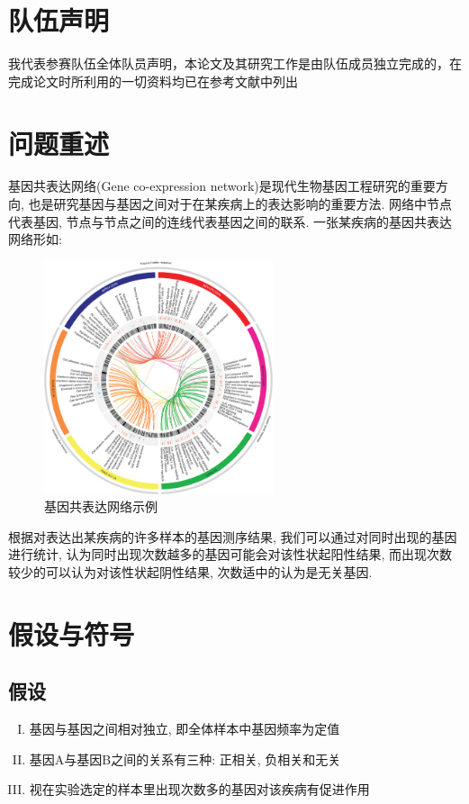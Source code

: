 \documentclass[zihao=-4]{ctexart}
\begin{document}
\newpage

\section*{队伍声明}

我代表参赛队伍全体队员声明，本论文及其研究工作是由队伍成员独立完成的，在完成论文时所利用的一切资料均已在参考文献中列出 
\newpage
\tableofcontents

\section{问题重述}
基因共表达网络(Gene co-expression network)是现代生物基因工程研究的重要方向, 也是研究基因与基因之间对于在某疾病上的表达影响的重要方法. 网络中节点代表基因, 节点与节点之间的连线代表基因之间的联系. 一张某疾病的基因共表达网络形如:
\begin{figure}[H]
    \centering
    \includegraphics[width=0.6\textwidth]{pic/example.jpg}
    \caption{基因共表达网络示例\cite{example}}
\end{figure}

根据对表达出某疾病的许多样本的基因测序结果, 我们可以通过对同时出现的基因进行统计, 认为同时出现次数越多的基因可能会对该性状起阳性结果, 而出现次数较少的可以认为对该性状起阴性结果, 次数适中的认为是无关基因.
\section{假设与符号}
\subsection{假设}

\begin{enumerate}[I.]
    \item 基因与基因之间相对独立, 即全体样本中基因频率为定值
    \item 基因A与基因B之间的关系有三种: 正相关, 负相关和无关
    \item 视在实验选定的样本里出现次数多的基因对该疾病有促进作用
\end{enumerate}
\end{document}
